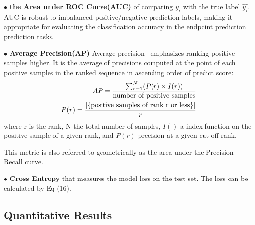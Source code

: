 \documentclass[letterpaper]{article} %
\begin{document}
$\bullet$ \textbf{the Area under ROC Curve(AUC)}
of comparing $y_i$ with the true label $\hat{y_i}$. AUC is robust to imbalanced positive/negative prediction labels, making it appropriate for evaluating the classification accuracy in the endpoint prediction prediction tasks.

$\bullet$ \textbf{Average Precision(AP)}
Average precision~\cite{turpin2006user} emphasizes ranking positive samples higher. It is the average of precisions computed at the point of each positive samples in the ranked sequence in ascending order of predict score:
\begin{align}
\setlength{\abovedisplayskip}{3pt}
AP = \frac{\sum_{r=1}^N (P(r) \times I(r))}{\mbox{number of positive samples}} \\
P(r) = \frac{|\{\mbox{positive samples of rank r or less}\}|}{r} 
\setlength{\belowdisplayskip}{3pt}
\end{align}
where r is the rank, N the total number of samples, $I()$ a index function on the positive sample of a given rank, and $P(r)$ precision at a given cut-off rank.
 
This metric is also referred to geometrically as the area under the Precision-Recall curve.

$\bullet$ \textbf{Cross Entropy}
that measures the model loss on the test set. The loss can be calculated
by Eq (16).

\subsection{Quantitative Results}
\end{document}
